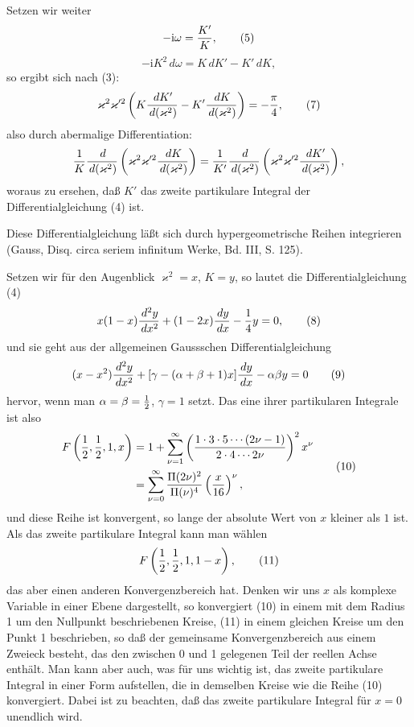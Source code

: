 \documentclass[11pt]{article}
\providecommand{\dd}{\,d}
\providecommand{\ii}{\mathrm{i}}
\begin{document}
Setzen wir weiter
\begin{equation}
-\ii\omega={K'\over K},
\tag{5}
\end{equation}
\begin{equation}
-\ii K^2\dd\omega=K\dd K'-K'\dd K,
\tag{6}
\end{equation}
so ergibt sich nach (3):
\begin{equation}
\varkappa^2\varkappa'^2\left(K{\dd K'\over\dd(\varkappa^2)}-K'{\dd K\over\dd(\varkappa^2)}\right)=-{\pi\over4},
\tag{7}
\end{equation}
also durch abermalige Differentiation:
\[
{1\over K}{\dd\over\dd(\varkappa^2)}
\left(\varkappa^2\varkappa'^2{\dd K\over\dd(\varkappa^2)}\right)
={1\over K'}{\dd\over\dd(\varkappa^2)}
\left(\varkappa^2\varkappa'^2{\dd K'\over\dd(\varkappa^2)}\right),
\]
woraus zu ersehen, daß $K'$ das zweite partikulare Integral der Differentialgleichung (4) ist.

Diese Differentialgleichung läßt sich durch hypergeometrische Reihen integrieren (Gauss, Disq. circa seriem infinitum Werke, Bd. III, S. 125).

Setzen wir für den Augenblick $\varkappa^2=x$, $K=y$, so lautet die Differentialgleichung (4)
\begin{equation}
x(1-x){\dd^2y\over\dd x^2}+(1-2x){\dd y\over\dd x}-{1\over4}y=0,
\tag{8}
\end{equation}
und sie geht aus der allgemeinen Gaussschen Differentialgleichung
\begin{equation}
(x-x^2){\dd^2y\over\dd x^2}+[\gamma-(\alpha+\beta+1)x]{\dd y\over\dd x}-\alpha\beta y=0
\tag{9}
\end{equation}
hervor, wenn man $\alpha=\beta={1\over2}$, $\gamma=1$ setzt. Das eine ihrer partikularen Integrale ist also
\begin{equation}
\begin{aligned}
F\left({1\over2},{1\over2},1,x\right)
&=1+\sum_{\nu=1}^{\infty}\left({1\cdot3\cdot5\cdots(2\nu-1)\over2\cdot4\cdots2\nu}\right)^2x^\nu\\
&=\sum_{\nu=0}^{\infty}{\Pi(2\nu)^2\over\Pi(\nu)^4}\left({x\over16}\right)^\nu,
\end{aligned}
\tag{10}
\end{equation}
und diese Reihe ist konvergent, so lange der absolute Wert von $x$ kleiner als $1$ ist. Als das zweite partikulare Integral kann man wählen
\begin{equation}
F\left({1\over2},{1\over2},1,1-x\right),
\tag{11}
\end{equation}
das aber einen anderen Konvergenzbereich hat. Denken wir uns $x$ als komplexe Variable in einer Ebene dargestellt, so konvergiert (10) in einem mit dem Radius 1 um den Nullpunkt beschriebenen Kreise, (11) in einem gleichen Kreise um den Punkt 1 beschrieben, so daß der gemeinsame Konvergenzbereich aus einem Zweieck besteht, das den zwischen 0 und 1 gelegenen Teil der reellen Achse enthält. Man kann aber auch, was für uns wichtig ist, das zweite partikulare Integral in einer Form aufstellen, die in demselben Kreise wie die Reihe (10) konvergiert. Dabei ist zu beachten, daß das zweite partikulare Integral für $x=0$ unendlich wird.
\end{document}
